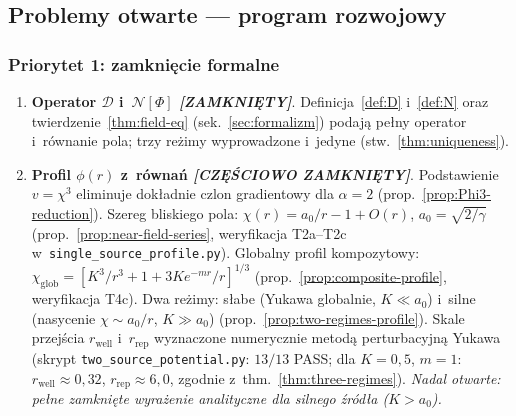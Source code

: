 \subsection{Problemy otwarte --- program rozwojowy}\label{ssec:program}

\subsubsection{Priorytet 1: zamkni\k{e}cie formalne}

\begin{enumerate}[label=\textbf{O\arabic*}., nosep]
  \item \textbf{Operator $\mathcal{D}$ i~$\mathcal{N}[\Phi]$
        \emph{[ZAMKNI\k{E}TY]}}.
        Definicja~\ref{def:D} i~\ref{def:N} oraz
        twierdzenie~\ref{thm:field-eq} (sek.~\ref{sec:formalizm})
        podaj\k{a} pe\l{}ny operator i~r\'ownanie pola;
        trzy re\.zimy wyprowadzone i~jedyne
        (stw.~\ref{thm:uniqueness}).

  \item \textbf{Profil $\phi(r)$ z~r\'owna\'n
        \emph{[CZ\k{E}\'SCIOWO ZAMKNI\k{E}TY]}}.
        Podstawienie $v = \chi^3$ eliminuje dok\l{}adnie czlon gradientowy
        dla $\alpha = 2$ (prop.~\ref{prop:Phi3-reduction}).
        Szereg bliskiego pola: $\chi(r) = a_0/r - 1 + O(r)$,
        $a_0 = \sqrt{2/\gamma}$ (prop.~\ref{prop:near-field-series},
        weryfikacja T2a--T2c w~\texttt{single\_source\_profile.py}).
        Globalny profil kompozytowy:
        $\chi_{\mathrm{glob}} = [K^3/r^3 + 1 + 3K e^{-mr}/r]^{1/3}$
        (prop.~\ref{prop:composite-profile}, weryfikacja T4c).
        Dwa re\.zimy: s\l{}abe (Yukawa globalnie, $K \ll a_0$)
        i~silne (nasycenie $\chi \sim a_0/r$, $K \gg a_0$)
        (prop.~\ref{prop:two-regimes-profile}).
        Skale przej\'scia $r_{\mathrm{well}}$ i~$r_{\mathrm{rep}}$ wyznaczone
        numerycznie metod\k{a} perturbacyjn\k{a} Yukawa
        (skrypt \texttt{two\_source\_potential.py}: $13/13$ PASS;
        dla $K=0{,}5$, $m=1$: $r_{\mathrm{well}} \approx 0{,}32$,
        $r_{\mathrm{rep}} \approx 6{,}0$, zgodnie z~thm.~\ref{thm:three-regimes}).
        \emph{Nadal otwarte: pe\l{}ne zamkni\k{e}te wyra\.zenie analityczne dla
        silnego \'zr\'od\l{}a ($K > a_0$).}


\end{enumerate}

